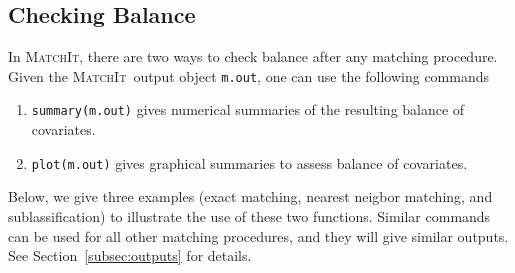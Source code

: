 \documentclass[oneside,letterpaper,titlepage]{article}
\newcommand{\MatchIt}{\textsc{MatchIt}}
\begin{document}

\subsection{Checking Balance}
\label{subsec:balance}

In \MatchIt, there are two ways to check balance after any matching
procedure. Given the \MatchIt\ output object {\tt m.out}, one can use
the following commands
\begin{enumerate}
\item \texttt{summary(m.out)} gives numerical summaries of the
  resulting balance of covariates.

\item \texttt{plot(m.out)} gives graphical summaries to assess balance
  of covariates.
\end{enumerate}
Below, we give three examples (exact matching, nearest neigbor matching, and sublassification) 
to illustrate the use of these two
functions. Similar commands can be used for all other matching
procedures, and they will give similar outputs. See
Section~\ref{subsec:outputs} for details.
\end{document}
